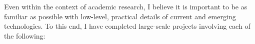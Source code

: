\documentclass[9pt]{developercv} %
\newcommand{\CPP}
{C\nolinebreak[4]\hspace{-.05em}\raisebox{.22ex}{++ }}
\begin{document}
\vspace{-1em}


Even within the context of academic research, I believe it is important to be as familiar as possible with low-level, practical details of current and emerging technologies. %
To this end, I have completed large-scale projects involving each of the following:

\vspace{.5em}




\end{document}

